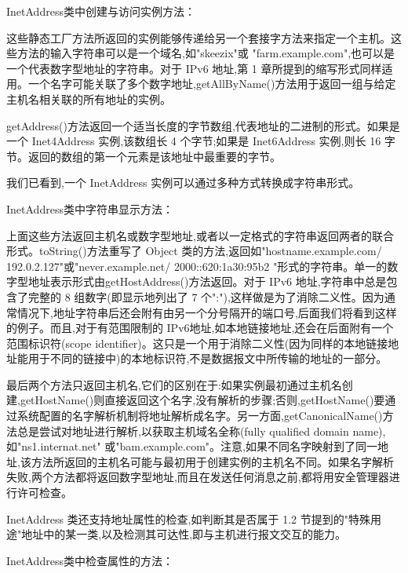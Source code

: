 		InetAddress类中创建与访问实例方法：

		

		这些静态工厂方法所返回的实例能够传递给另一个套接字方法来指定一个主机。这些方法的输入字符串可以是一个域名,如"skeezix"或 "farm.example.com",也可以是一个代表数字型地址的字符串。对于 IPv6 地址,第 1 章所提到的缩写形式同样适用。一个名字可能关联了多个数字地址,getAllByName()方法用于返回一组与给定主机名相关联的所有地址的实例。

		getAddress()方法返回一个适当长度的字节数组,代表地址的二进制的形式。如果是一个 Inet4Address 实例,该数组长 4 个字节;如果是 Inet6Address 实例,则长 16 字节。返回的数组的第一个元素是该地址中最重要的字节。

		我们已看到,一个 InetAddress 实例可以通过多种方式转换成字符串形式。

		InetAddress类中字符串显示方法：

		

		上面这些方法返回主机名或数字型地址,或者以一定格式的字符串返回两者的联合形式。toString()方法重写了 Object 类的方法,返回如"hostname.example.com/ 192.0.2.127"或"never.example.net/ 2000::620:1a30:95b2 "形式的字符串。单一的数字型地址表示形式由getHostAddress()方法返回。对于 IPv6 地址,字符串中总是包含了完整的 8 组数字(即显示地列出了 7 个":"),这样做是为了消除二义性。因为通常情况下,地址字符串后还会附有由另一个分号隔开的端口号,后面我们将看到这样的例子。而且,对于有范围限制的 IPv6地址,如本地链接地址,还会在后面附有一个范围标识符(scope identifier)。这只是一个用于消除二义性(因为同样的本地链接地址能用于不同的链接中)的本地标识符,不是数据报文中所传输的地址的一部分。

		最后两个方法只返回主机名,它们的区别在于:如果实例最初通过主机名创建,getHostName()则直接返回这个名字,没有解析的步骤;否则,getHostName()要通过系统配置的名字解析机制将地址解析成名字。另一方面,getCanonicalName()方法总是尝试对地址进行解析,以获取主机域名全称(fully qualified domain name),如"ns1.internat.net" 或"bam.example.com"。注意,如果不同名字映射到了同一地址,该方法所返回的主机名可能与最初用于创建实例的主机名不同。如果名字解析失败,两个方法都将返回数字型地址,而且在发送任何消息之前,都将用安全管理器进行许可检查。

		InetAddress 类还支持地址属性的检查,如判断其是否属于 1.2 节提到的"特殊用途"地址中的某一类,以及检测其可达性,即与主机进行报文交互的能力。

		InetAddress类中检查属性的方法：

